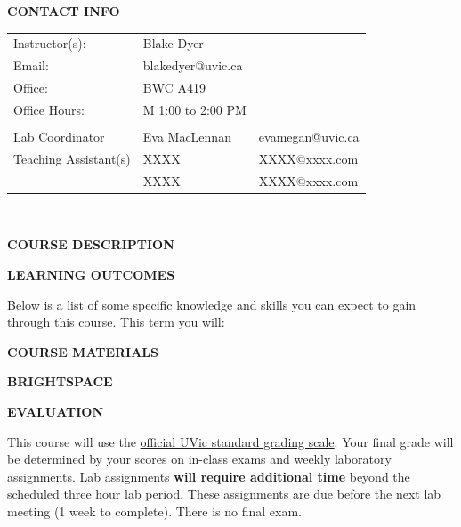 \documentclass[11pt]{article}
\begin{document}
\textbf{CONTACT INFO}

\begin{center}
  \centering
  \begin{tabular}{ L{.25\linewidth}L{.25\linewidth}L{.25\linewidth} }
    Instructor(s):      & Blake Dyer &  \\
    Email:      & blakedyer@uvic.ca &  \\
    Office:      & BWC A419 &  \\
    Office Hours:      & M 1:00 to 2:00 PM &  \\
          &  &  \\
    Lab Coordinator      & Eva MacLennan &  evamegan@uvic.ca\\
Teaching Assistant(s)      & XXXX & XXXX@xxxx.com \\
      & XXXX & XXXX@xxxx.com \\
  \end{tabular}\\
\end{center}

\begin{center}
\textbf{COURSE DESCRIPTION}
\end{center}



\clearpage

\textbf{LEARNING OUTCOMES}

Below is a list of some specific knowledge and skills you can expect to gain through this course. This term you will:
\begin{itemize}
	\setlength\itemsep{0em}
        {\item \learningoutcome}
\end{itemize}

\textbf{COURSE MATERIALS}



\textbf{BRIGHTSPACE}



\begin{center}
  \textbf{EVALUATION}
\end{center}

This course will use the \href{https://www.uvic.ca/calendar/future/undergrad/index.php#/policy/S1AAgoGuV?bc=true&bcCurrent=14%20-%20Grading&bcGroup=Undergraduate%20Academic%20Regulations&bcItemType=policies}{official UVic standard grading scale}. Your final grade will be determined by your scores on in-class exams and weekly laboratory assignments. Lab assignments \textbf{will require additional time} beyond the scheduled three hour lab period. These assignments are due before the next lab meeting (1 week to complete). There is no final exam.
\end{document}
